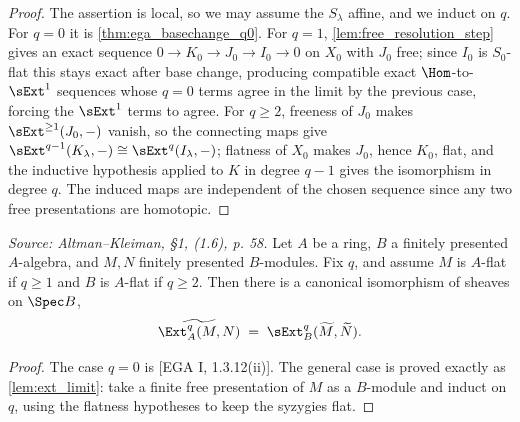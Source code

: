 \begin{lemma}
\begin{proof}
    The assertion is local, so we may assume the $S_\lambda$ affine, and we
    induct on $q$. For $q = 0$ it is \cref{thm:ega_basechange_q0}. For $q=1$,
    \cref{lem:free_resolution_step} gives an exact sequence
    $0 \to K_0 \to J_0 \to I_0 \to 0$ on $X_0$ with $J_0$ free; since $I_0$ is
    $S_0$-flat this stays exact after base change, producing compatible exact
    $\Hom$-to-$\sExt^1$ sequences whose $q=0$ terms agree in the limit by the
    previous case, forcing the $\sExt^1$ terms to agree. For $q \geq 2$, freeness
    of $J_0$ makes $\sExt^{\geq 1}(J_0, -)$ vanish, so the connecting maps give
    $\sExt^{q-1}(K_\lambda, -) \cong \sExt^q(I_\lambda, -)$; flatness of $X_0$
    makes $J_0$, hence $K_0$, flat, and the inductive hypothesis applied to $K$
    in degree $q-1$ gives the isomorphism in degree $q$. The induced maps are
    independent of the chosen sequence since any two free presentations are
    homotopic.
  \end{proof}
\end{lemma}

\begin{lemma}
  \label{lem:ext_algebra_basechange}
  \textit{Source: Altman--Kleiman, §1, (1.6), p. 58.}
  Let $A$ be a ring, $B$ a finitely presented $A$-algebra, and $M, N$ finitely
  presented $B$-modules. Fix $q$, and assume $M$ is $A$-flat if $q \geq 1$ and $B$
  is $A$-flat if $q \geq 2$. Then there is a canonical isomorphism of sheaves on
  $\Spec B$,
  \[
    \widetilde{\Ext^q_A(M, N)} \;=\; \sExt^q_B(\widetilde M, \widetilde N).
  \]
  \begin{proof}
    The case $q = 0$ is [EGA I, 1.3.12(ii)]. The general case is proved exactly
    as \cref{lem:ext_limit}: take a finite free presentation of $M$ as a
    $B$-module and induct on $q$, using the flatness hypotheses to keep the
    syzygies flat.
  \end{proof}
\end{lemma}

